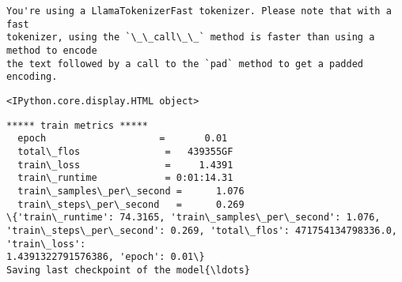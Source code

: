 \documentclass[11pt]{article}
\begin{document}
    \begin{Verbatim}[commandchars=\\\{\}]
You're using a LlamaTokenizerFast tokenizer. Please note that with a fast
tokenizer, using the `\_\_call\_\_` method is faster than using a method to encode
the text followed by a call to the `pad` method to get a padded encoding.
    \end{Verbatim}

    
    \begin{Verbatim}[commandchars=\\\{\}]
<IPython.core.display.HTML object>
    \end{Verbatim}

    
    \begin{Verbatim}[commandchars=\\\{\}]
***** train metrics *****
  epoch                    =       0.01
  total\_flos               =   439355GF
  train\_loss               =     1.4391
  train\_runtime            = 0:01:14.31
  train\_samples\_per\_second =      1.076
  train\_steps\_per\_second   =      0.269
\{'train\_runtime': 74.3165, 'train\_samples\_per\_second': 1.076,
'train\_steps\_per\_second': 0.269, 'total\_flos': 471754134798336.0, 'train\_loss':
1.4391322791576386, 'epoch': 0.01\}
Saving last checkpoint of the model{\ldots}
    \end{Verbatim}
\end{document}
